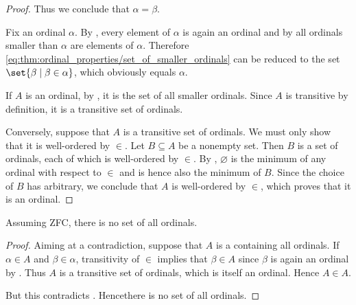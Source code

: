 \begin{proof}
  Thus we conclude that \( \alpha = \beta \).

   Fix an ordinal \( \alpha \). By , every element of \( \alpha \) is again an ordinal and by  all ordinals smaller than \( \alpha \) are elements of \( \alpha \). Therefore \eqref{eq:thm:ordinal_properties/set_of_smaller_ordinals} can be reduced to the set \( \set{ \beta \given \beta \in \alpha } \), which obviously equals \( \alpha \).

   If \( A \) is an ordinal, by , it is the set of all smaller ordinals. Since \( A \) is transitive by definition, it is a transitive set of ordinals.

  Conversely, suppose that \( A \) is a transitive set of ordinals. We must only show that it is well-ordered by \( \in \). Let \( B \subseteq A \) be a nonempty set. Then \( B \) is a set of ordinals, each of which is well-ordered by \( \in \). By , \( \varnothing \) is the minimum of any ordinal with respect to \( \in \) and is hence also the minimum of \( B \). Since the choice of \( B \) has arbitrary, we conclude that \( A \) is well-ordered by \( \in \), which proves that it is an ordinal.
\end{proof}

\begin{theorem}\label{thm:burali_forti_paradox}
  Assuming ZFC, there is no set of all ordinals.
\end{theorem}
\begin{proof}
  Aiming at a contradiction, suppose that \( A \) is a containing all ordinals. If \( \alpha \in A \) and \( \beta \in \alpha \), transitivity of \( \in \) implies that \( \beta \in A \) since \( \beta \) is again an ordinal by . Thus \( A \) is a transitive set of ordinals, which  is itself an ordinal. Hence \( A \in A \).

  But this contradicts . Hence\DNE there is no set of all ordinals.
\end{proof}
